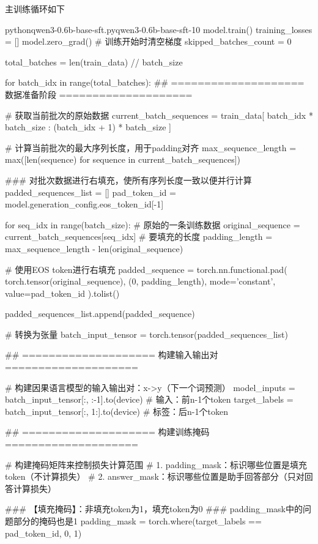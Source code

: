 \documentclass[lang=cn,newtx,10pt,scheme=chinese]{elegantbook}
\begin{document}
主训练循环如下

\begin{codebox}{python}{qwen3-0.6b-base-sft.py}{qwen3-0.6b-base-sft-10}
model.train()
training_losses = []
model.zero_grad()  # 训练开始时清空梯度
skipped_batches_count = 0

total_batches = len(train_data) // batch_size

for batch_idx in range(total_batches):
    ## ==================== 数据准备阶段 ====================
    
    # 获取当前批次的原始数据
    current_batch_sequences = train_data[
        batch_idx * batch_size : (batch_idx + 1) * batch_size
    ]
    
    # 计算当前批次的最大序列长度，用于padding对齐
    max_sequence_length = max([len(sequence) for sequence in current_batch_sequences])
    
    ### 对批次数据进行右填充，使所有序列长度一致以便并行计算
    padded_sequences_list = []
    pad_token_id = model.generation_config.eos_token_id[-1]
    
    for seq_idx in range(batch_size):
        # 原始的一条训练数据
        original_sequence = current_batch_sequences[seq_idx]
        # 要填充的长度
        padding_length = max_sequence_length - len(original_sequence)
        
        # 使用EOS token进行右填充
        padded_sequence = torch.nn.functional.pad(
            torch.tensor(original_sequence),
            (0, padding_length),
            mode='constant',
            value=pad_token_id
        ).tolist()
        
        padded_sequences_list.append(padded_sequence)
    
    # 转换为张量
    batch_input_tensor = torch.tensor(padded_sequences_list)

    ## ==================== 构建输入输出对 ====================
    
    # 构建因果语言模型的输入输出对：x->y（下一个词预测）
    model_inputs = batch_input_tensor[:, :-1].to(device)    # 输入：前n-1个token
    target_labels = batch_input_tensor[:, 1:].to(device)    # 标签：后n-1个token

    ## ==================== 构建训练掩码 ====================
    
    # 构建掩码矩阵来控制损失计算范围
    # 1. padding_mask：标识哪些位置是填充token（不计算损失）
    # 2. answer_mask：标识哪些位置是助手回答部分（只对回答计算损失）
    
    ### 【填充掩码】：非填充token为1，填充token为0
    ### padding_mask中的问题部分的掩码也是1
    padding_mask = torch.where(target_labels == pad_token_id, 0, 1)
    

\end{codebox}
\end{document}
